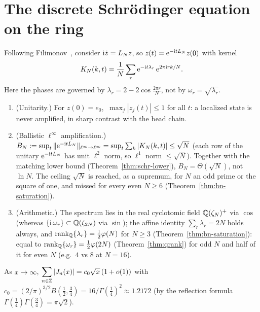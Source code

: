 \section{The discrete Schr\"odinger equation on the ring}\label{sec:schr}

Following Filimonov~\cite{F23}, consider $\mathrm{i}\dot z=L_N z$, so $z(t)=\mathrm{e}^{-\mathrm{i}tL_N}z(0)$ with kernel
\[
  K_N(k,t)=\frac1N\sum_r\mathrm{e}^{-\mathrm{i}t\lambda_r}\,\mathrm{e}^{2\pi\mathrm{i}rk/N}.
\]
Here the phases are governed by $\lambda_r=2-2\cos\tfrac{2\pi r}{N}$, not by $\omega_r=\sqrt{\lambda_r}$.

\begin{theorem}\label{thm:schr}
\begin{enumerate}
\item (Unitarity.) For $z(0)=e_0$, $\ \max_j|z_j(t)|\le1$ for all $t$: a localized state is never
amplified, in sharp contrast with the bead chain.
\item (Ballistic $\ell^\infty$ amplification.)
$B_N:=\sup_t\|\mathrm{e}^{-\mathrm{i}tL_N}\|_{\ell^\infty\to\ell^\infty}=\sup_t\sum_k|K_N(k,t)|\le\sqrt N$
(each row of the unitary $\mathrm{e}^{-\mathrm itL_N}$ has unit $\ell^2$ norm, so $\ell^1$ norm $\le\sqrt N$).
Together with the matching lower bound (Theorem~\ref{thm:schr-lower}), $B_N=\Theta(\sqrt N)$, not $\ln N$.
The ceiling $\sqrt N$ is reached, as a supremum, for $N$ an odd prime or the square of one, and missed
for every even $N\ge6$ (Theorem~\ref{thm:bn-saturation}).
\item (Arithmetic.) The spectrum lies in the real cyclotomic field $\mathbb{Q}(\zeta_N)^+$ via $\cos$ (whereas
$\{\mathrm i\,\omega_r\}\subset\mathbb{Q}(\zeta_{2N})$ via $\sin$); the affine identity $\sum_r\lambda_r=2N$ holds always,
and $\operatorname{rank}_{\mathbb{Q}}\{\lambda_r\}=\tfrac12\varphi(N)$ for $N\ge3$ (Theorem~\ref{thm:bn-saturation}): equal to
$\operatorname{rank}_{\mathbb{Q}}\{\omega_r\}=\tfrac12\varphi(2N)$ (Theorem~\ref{thm:qrank}) for odd $N$ and half of it for even $N$
(e.g.\ $4$ vs $8$ at $N=16$).
\end{enumerate}
\end{theorem}

\begin{lemma}\label{lem:bessel-l1}
As $x\to\infty$, $\displaystyle\sum_{n\in\mathbb{Z}}|J_n(x)|=c_0\sqrt x\,(1+o(1))$ with
$c_0=(2/\pi)^{3/2}B(\tfrac12,\tfrac34)=16/\Gamma(\tfrac14)^2\approx1.2172$ (by the reflection formula
$\Gamma(\tfrac14)\Gamma(\tfrac34)=\pi\sqrt2$).
\end{lemma}

